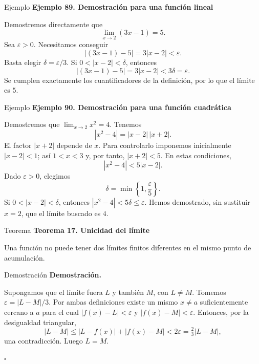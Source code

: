 \documentclass[12pt,aspectratio=169]{beamer}
\begin{document}
\begin{frame}[t,allowframebreaks]{Ejemplo}
{\color{azul}\bfseries Ejemplo 89. Demostración para una función lineal}\par\medskip

Demostremos directamente que
\[\lim_{x\to2}(3x-1)=5.\]
Sea $\varepsilon>0$. Necesitamos conseguir
\[
|(3x-1)-5|=3|x-2|<\varepsilon.
\]
Basta elegir $\delta=\varepsilon/3$. Si $0<|x-2|<\delta$, entonces
\[
|(3x-1)-5|=3|x-2|<3\delta=\varepsilon.
\]
Se cumplen exactamente los cuantificadores de la definición, por lo que el límite es $5$.
\end{frame}


\begin{frame}[t,allowframebreaks]{Ejemplo}
{\color{azul}\bfseries Ejemplo 90. Demostración para una función cuadrática}\par\medskip

Demostremos que $\lim_{x\to2}x^2=4$. Tenemos
\[
|x^2-4|=|x-2|\,|x+2|.
\]
El factor $|x+2|$ depende de $x$. Para controlarlo imponemos inicialmente $|x-2|<1$; así $1<x<3$ y, por tanto, $|x+2|<5$. En estas condiciones,
\[
|x^2-4|<5|x-2|.
\]
Dado $\varepsilon>0$, elegimos
\[
\boxed{\delta=\min\left\{1,\frac{\varepsilon}{5}\right\}.}
\]
Si $0<|x-2|<\delta$, entonces $|x^2-4|<5\delta\le\varepsilon$. Hemos demostrado, sin sustituir $x=2$, que el límite buscado es $4$.
\end{frame}


\begin{frame}[t,allowframebreaks]{Teorema}
{\color{azul}\bfseries Teorema 17. Unicidad del límite}\par\medskip

Una función no puede tener dos límites finitos diferentes en el mismo punto de acumulación.
\end{frame}


\begin{frame}[t,allowframebreaks]{Demostración}
{\color{azul}\bfseries Demostración.}\par\smallskip

Supongamos que el límite fuera $L$ y también $M$, con $L\ne M$. Tomemos $\varepsilon=|L-M|/3$. Por ambas definiciones existe un mismo $x\ne a$ suficientemente cercano a $a$ para el cual $|f(x)-L|<\varepsilon$ y $|f(x)-M|<\varepsilon$. Entonces, por la desigualdad triangular,
\[
|L-M|\le |L-f(x)|+|f(x)-M|<2\varepsilon=\tfrac23|L-M|,
\]
una contradicción. Luego $L=M$.

\hfill $\square$
\end{frame}
\end{document}

